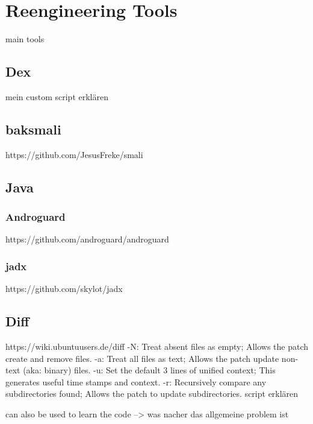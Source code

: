 \section{Reengineering Tools}\label{section:tools}
main tools
\subsection{Dex}\label{subsection:tools-dex}
mein custom script erklären

\subsection{baksmali}\label{subsection:tools-baksmali}
https://github.com/JesusFreke/smali

\subsection{Java}\label{subsection:tools-java}
\subsubsection{Androguard}\label{subsection:tools-java-androguard}
https://github.com/androguard/androguard
\subsubsection{jadx}\label{subsection:tools-java-jadx}
https://github.com/skylot/jadx


\subsection{Diff}\label{subsection:tools-diff}
https://wiki.ubuntuusers.de/diff\newline
-N: Treat absent files as empty; Allows the patch create and remove files.\newline
-a: Treat all files as text; Allows the patch update non-text (aka: binary) files.\newline
-u: Set the default 3 lines of unified context; This generates useful time stamps and context.\newline
-r: Recursively compare any subdirectories found; Allows the patch to update subdirectories.\newline
script erklären\newline




can also be used to learn the code --> was nacher das allgemeine problem ist\newline

